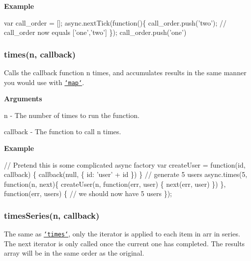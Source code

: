 {\bfseries Example}


\begin{DoxyCode}
var call\_order = [];
async.nextTick(\textcolor{keyword}{function}()\{
    call\_order.push(\textcolor{stringliteral}{'two'});
    \textcolor{comment}{// call\_order now equals ['one','two']}
\});
call\_order.push(\textcolor{stringliteral}{'one'})
\end{DoxyCode}


\label{_times}%
 \subsubsection*{times(n, callback)}

Calls the {\ttfamily callback} function {\ttfamily n} times, and accumulates results in the same manner you would use with \href{#map}{\tt `map`}.

{\bfseries Arguments}


\begin{DoxyItemize}
\item {\ttfamily n} -\/ The number of times to run the function.
\item {\ttfamily callback} -\/ The function to call {\ttfamily n} times.
\end{DoxyItemize}

{\bfseries Example}


\begin{DoxyCode}
\textcolor{comment}{// Pretend this is some complicated async factory}
var createUser = \textcolor{keyword}{function}(id, callback) \{
  callback(null, \{
    \textcolor{keywordtype}{id}: \textcolor{stringliteral}{'user'} + \textcolor{keywordtype}{id}
  \})
\}
\textcolor{comment}{// generate 5 users}
async.times(5, \textcolor{keyword}{function}(n, next)\{
    createUser(n, function(err, user) \{
      next(err, user)
    \})
\}, \textcolor{keyword}{function}(err, users) \{
  \textcolor{comment}{// we should now have 5 users}
\});
\end{DoxyCode}


\label{_timesSeries}%
 \subsubsection*{times\+Series(n, callback)}

The same as \href{#times}{\tt `times`}, only the iterator is applied to each item in {\ttfamily arr} in series. The next {\ttfamily iterator} is only called once the current one has completed. The results array will be in the same order as the original.

